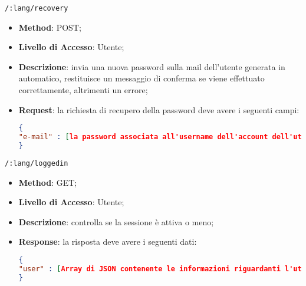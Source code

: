 	\item \texttt{/:lang/recovery}
		\begin{itemize}
			\item \textbf{Method}: POST;
			\item \textbf{Livello di Accesso}: Utente;
			\item \textbf{Descrizione}: invia una nuova password sulla mail dell'utente generata in automatico, restituisce un messaggio di conferma se viene effettuato correttamente, altrimenti un errore;
			\item \textbf{Request}: la richiesta di recupero della password deve avere i seguenti campi:
\begin{lstlisting}[language=json,firstnumber=1]
{
"e-mail" : [la password associata all'username dell'account dell'utente]
}
\end{lstlisting}
		\end{itemize}
		
	\item \texttt{/:lang/loggedin}
		\begin{itemize}
			\item \textbf{Method}: GET;
			\item \textbf{Livello di Accesso}: Utente;
			\item \textbf{Descrizione}: controlla se la sessione è attiva o meno;
			\item \textbf{Response}: la risposta deve avere i seguenti dati:
\begin{lstlisting}[language=json,firstnumber=1]
{
"user" : [Array di JSON contenente le informazioni riguardanti l'utente autenticato]
}
\end{lstlisting}
		\end{itemize}	